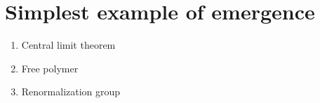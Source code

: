 \section{Simplest example of emergence}

\begin{enumerate}
	\item Central limit theorem
	\item Free polymer
	\item Renormalization group
\end{enumerate}
